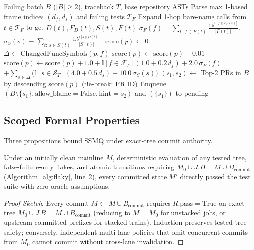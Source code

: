 \begin{algorithm}[t]
\caption{1-Step AST/Traceback Blame (\textsc{CausalBlameAndSplit})}
\label{alg:blame}
\begin{algorithmic}[1]
\REQUIRE Failing batch $B$ ($|B| \ge 2$), traceback $T$, base repository ASTs
\STATE Parse max 1-based frame indices $(d_f, d_s)$ and failing tests $\mathcal{T}_F$
\STATE Expand 1-hop bare-name calls from $t \in \mathcal{T}_F$ to get $D(t), F_D(t), S(t), F(t)$
\STATE $\sigma_F(f)=\sum_{t:\, f\in F(t)}\frac{1.5^{\mathbb{I}[f\in F_D(t)]}}{|F(t)|}$, $\sigma_S(s)=\sum_{t:\, s\in S(t)}\frac{1.5^{\mathbb{I}[s\in D(t)]}}{|S(t)|}$
    \STATE $\text{score}(p) \leftarrow 0$
        \STATE $\Delta \leftarrow \text{ChangedFuncSymbols}(p, f)$
        \IF{$\Delta = \emptyset$}
            \STATE $\text{score}(p) \leftarrow \text{score}(p) + 0.01$
        \ELSE
            \STATE $\text{score}(p) \leftarrow \text{score}(p) + 1.0 + \mathbb{I}[f\in\mathcal{F}_T](1.0 + 0.2\,d_f) + 2.0\,\sigma_F(f)$
            \STATE \qquad $+\sum_{s \in \Delta}\big(\mathbb{I}[s\in\mathcal{S}_T](4.0 + 0.5\,d_s) + 10.0\,\sigma_S(s)\big)$
        \ENDIF
    \ENDFOR
\ENDFOR
\STATE $(s_1, s_2) \leftarrow$ Top-2 PRs in $B$ by descending $\text{score}(p)$ (tie-break: PR ID)
\STATE Enqueue $(B \setminus \{s_1\}, \text{allow\_blame}=\text{False}, \text{hint}=s_2)$ and $(\{s_1\})$ to pending
\end{algorithmic}
\end{algorithm}

\subsection{Scoped Formal Properties}
Three propositions bound SSMQ under exact-tree commit authority.

\begin{proposition}
\label{prop:safety}
Under an initially clean mainline $M$, deterministic evaluation of any tested tree, false-failure-only flakes, and atomic transitions requiring $M_0 \cup J.B = M \cup B_{\text{commit}}$ (Algorithm~\ref{alg:flaky}, line~2), every committed state $M'$ directly passed the test suite with zero oracle assumptions.
\end{proposition}
\begin{proof}[Proof Sketch]
Every commit $M \leftarrow M \cup B_{\text{commit}}$ requires $R.\text{pass}{=}\text{True}$ on exact tree $M_0 \cup J.B = M \cup B_{\text{commit}}$ (reducing to $M{=}M_0$ for unstacked jobs, or upstream committed prefixes for stacked trains). Induction preserves tested-tree safety; conversely, independent multi-lane policies that omit concurrent commits from $M_0$ cannot commit without cross-lane invalidation.
\end{proof}

